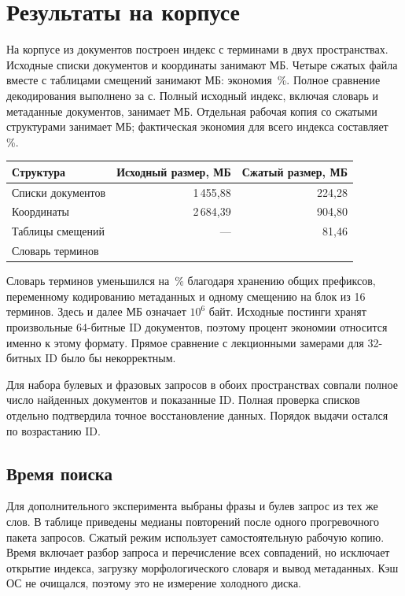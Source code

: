 \documentclass[12pt,a4paper]{article}
\begin{document}
\section{Результаты на корпусе}
На корпусе из \LabElevenDocs{} документов построен индекс с
\LabElevenTerms{} терминами в двух пространствах. Исходные списки документов
и координаты занимают \LabElevenRawMB{} МБ. Четыре сжатых файла вместе
с таблицами смещений занимают \LabElevenCompactMB{} МБ: экономия
\LabElevenSavings\,\%. Полное сравнение декодирования выполнено за
\LabElevenVerifySec{} с.
Полный исходный индекс, включая словарь и метаданные документов, занимает
\LabElevenWholeRawMB{} МБ. Отдельная рабочая копия со сжатыми структурами занимает
\LabElevenPackedMB{} МБ; фактическая экономия для всего индекса составляет
\LabElevenWholeSavings\,\%.

\begin{center}
\begin{tabular}{@{}lrr@{}}
\toprule
Структура & Исходный размер, МБ & Сжатый размер, МБ\\
\midrule
Списки документов & 1\,455{,}88 & 224{,}28\\
Координаты & 2\,684{,}39 & 904{,}80\\
Таблицы смещений & --- & 81{,}46\\
Словарь терминов & \LabElevenVocabRawMB{} & \LabElevenVocabCompactMB{}\\
\bottomrule
\end{tabular}
\end{center}
Словарь терминов уменьшился на \LabElevenVocabSavings\,\% благодаря хранению
общих префиксов, переменному кодированию метаданных и одному смещению
на блок из 16 терминов. Здесь и далее МБ означает $10^6$ байт.
Исходные постинги хранят произвольные 64-битные ID документов, поэтому
процент экономии относится именно к этому формату. Прямое сравнение
с лекционными замерами для 32-битных ID было бы некорректным.

Для набора булевых и фразовых запросов в обоих пространствах совпали полное число
найденных документов и показанные ID. Полная проверка списков отдельно
подтвердила точное восстановление данных. Порядок выдачи остался
по возрастанию ID.

\subsection{Время поиска}
Для дополнительного эксперимента выбраны фразы и булев запрос из тех же слов.
В таблице приведены медианы \ProfileRepeats{} повторений после одного
прогревочного пакета запросов. Сжатый режим использует самостоятельную
рабочую копию. Время включает разбор запроса и перечисление всех совпадений,
но исключает открытие индекса, загрузку морфологического словаря и вывод
метаданных. Кэш ОС не очищался, поэтому это не измерение холодного диска.
\end{document}
